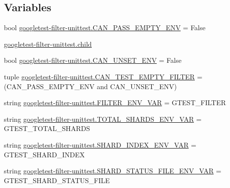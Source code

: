 \subsection*{Variables}
\begin{DoxyCompactItemize}
\item 
bool \mbox{\hyperlink{namespacegoogletest-filter-unittest_ad4dd127fd724efb14ebe07685502b1bc}{googletest-\/filter-\/unittest.\+C\+A\+N\+\_\+\+P\+A\+S\+S\+\_\+\+E\+M\+P\+T\+Y\+\_\+\+E\+NV}} = False
\item 
\mbox{\hyperlink{namespacegoogletest-filter-unittest_a9eaaae3d0fe9a68dca2437c6866973e9}{googletest-\/filter-\/unittest.\+child}}
\item 
bool \mbox{\hyperlink{namespacegoogletest-filter-unittest_a12d2eb0489390acb505e766b80fa3ed3}{googletest-\/filter-\/unittest.\+C\+A\+N\+\_\+\+U\+N\+S\+E\+T\+\_\+\+E\+NV}} = False
\item 
tuple \mbox{\hyperlink{namespacegoogletest-filter-unittest_a6ceb9364ef75b2c00a185e27de236af3}{googletest-\/filter-\/unittest.\+C\+A\+N\+\_\+\+T\+E\+S\+T\+\_\+\+E\+M\+P\+T\+Y\+\_\+\+F\+I\+L\+T\+ER}} = (C\+A\+N\+\_\+\+P\+A\+S\+S\+\_\+\+E\+M\+P\+T\+Y\+\_\+\+E\+NV and C\+A\+N\+\_\+\+U\+N\+S\+E\+T\+\_\+\+E\+NV)
\item 
string \mbox{\hyperlink{namespacegoogletest-filter-unittest_a46498d9c10f33d630f16a77666c5faf7}{googletest-\/filter-\/unittest.\+F\+I\+L\+T\+E\+R\+\_\+\+E\+N\+V\+\_\+\+V\+AR}} = \textquotesingle{}G\+T\+E\+S\+T\+\_\+\+F\+I\+L\+T\+ER\textquotesingle{}
\item 
string \mbox{\hyperlink{namespacegoogletest-filter-unittest_ab5b5d00d328eeb72a3b1a8612c700c5c}{googletest-\/filter-\/unittest.\+T\+O\+T\+A\+L\+\_\+\+S\+H\+A\+R\+D\+S\+\_\+\+E\+N\+V\+\_\+\+V\+AR}} = \textquotesingle{}G\+T\+E\+S\+T\+\_\+\+T\+O\+T\+A\+L\+\_\+\+S\+H\+A\+R\+DS\textquotesingle{}
\item 
string \mbox{\hyperlink{namespacegoogletest-filter-unittest_a1843aa3828bc65cef41d1978f4a1b650}{googletest-\/filter-\/unittest.\+S\+H\+A\+R\+D\+\_\+\+I\+N\+D\+E\+X\+\_\+\+E\+N\+V\+\_\+\+V\+AR}} = \textquotesingle{}G\+T\+E\+S\+T\+\_\+\+S\+H\+A\+R\+D\+\_\+\+I\+N\+D\+EX\textquotesingle{}
\item 
string \mbox{\hyperlink{namespacegoogletest-filter-unittest_a9855050e7626b36620408737b7f8d56c}{googletest-\/filter-\/unittest.\+S\+H\+A\+R\+D\+\_\+\+S\+T\+A\+T\+U\+S\+\_\+\+F\+I\+L\+E\+\_\+\+E\+N\+V\+\_\+\+V\+AR}} = \textquotesingle{}G\+T\+E\+S\+T\+\_\+\+S\+H\+A\+R\+D\+\_\+\+S\+T\+A\+T\+U\+S\+\_\+\+F\+I\+LE\textquotesingle{}
\item 

\end{DoxyCompactItemize}
